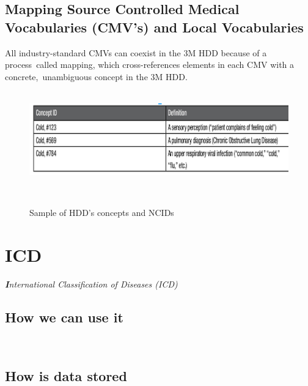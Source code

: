 \documentclass[DIV=calc, paper=a4, fontsize=12pt, onecolumn]{scrartcl}	 %
\newcommand{\initial}[1]{ %
\lettrine[lines=3,lhang=0.3,nindent=0em,slope=0em]{
\color{DarkBlue}
{\textbf{\textit{#1}}}}{}}
\begin{document}
  \subsection{Mapping Source Controlled Medical Vocabularies (CMV's) and Local Vocabularies}
  All industry-standard CMVs can coexist in the 3M HDD because of a process\
  called mapping, which cross-references elements in each CMV with a concrete,\
  unambiguous concept in the 3M HDD.\\
  \citep{_3M_HDD_Product_Overview_2010}\

  \begin{figure}[ht!]
    \label{fig:cid}
    \centering
    \includegraphics[scale=0.4]{conceptid.png}
    \caption{Sample of HDD's concepts and NCIDs}\
    \citep{_3M_HDD_Product_Overview_2010}\
  \end{figure}  



  \section[International Classification of Diseases (ICD) ]{ICD}
  \label{sec:icd}

  \initial{I}\textit{nternational Classification of Diseases (ICD)}\\

  \subsection{How we can use it}\


  \subsection{How is data stored}\

\end{document}
